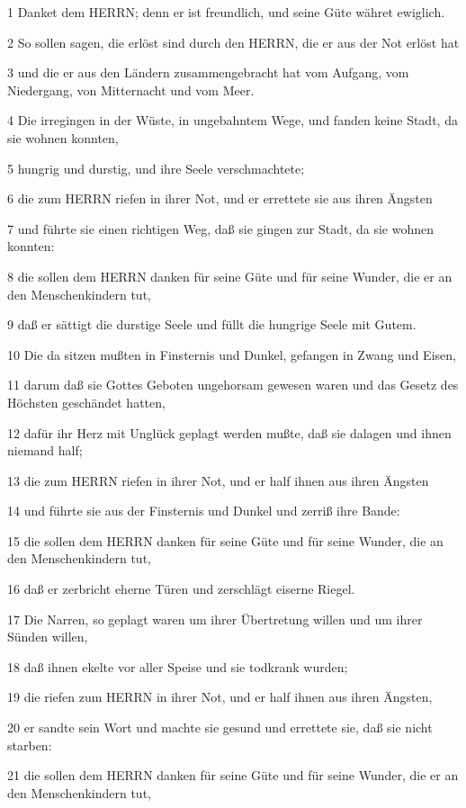 \par 1 Danket dem HERRN; denn er ist freundlich, und seine Güte währet ewiglich.
\par 2 So sollen sagen, die erlöst sind durch den HERRN, die er aus der Not erlöst hat
\par 3 und die er aus den Ländern zusammengebracht hat vom Aufgang, vom Niedergang, von Mitternacht und vom Meer.
\par 4 Die irregingen in der Wüste, in ungebahntem Wege, und fanden keine Stadt, da sie wohnen konnten,
\par 5 hungrig und durstig, und ihre Seele verschmachtete;
\par 6 die zum HERRN riefen in ihrer Not, und er errettete sie aus ihren Ängsten
\par 7 und führte sie einen richtigen Weg, daß sie gingen zur Stadt, da sie wohnen konnten:
\par 8 die sollen dem HERRN danken für seine Güte und für seine Wunder, die er an den Menschenkindern tut,
\par 9 daß er sättigt die durstige Seele und füllt die hungrige Seele mit Gutem.
\par 10 Die da sitzen mußten in Finsternis und Dunkel, gefangen in Zwang und Eisen,
\par 11 darum daß sie Gottes Geboten ungehorsam gewesen waren und das Gesetz des Höchsten geschändet hatten,
\par 12 dafür ihr Herz mit Unglück geplagt werden mußte, daß sie dalagen und ihnen niemand half;
\par 13 die zum HERRN riefen in ihrer Not, und er half ihnen aus ihren Ängsten
\par 14 und führte sie aus der Finsternis und Dunkel und zerriß ihre Bande:
\par 15 die sollen dem HERRN danken für seine Güte und für seine Wunder, die an den Menschenkindern tut,
\par 16 daß er zerbricht eherne Türen und zerschlägt eiserne Riegel.
\par 17 Die Narren, so geplagt waren um ihrer Übertretung willen und um ihrer Sünden willen,
\par 18 daß ihnen ekelte vor aller Speise und sie todkrank wurden;
\par 19 die riefen zum HERRN in ihrer Not, und er half ihnen aus ihren Ängsten,
\par 20 er sandte sein Wort und machte sie gesund und errettete sie, daß sie nicht starben:
\par 21 die sollen dem HERRN danken für seine Güte und für seine Wunder, die er an den Menschenkindern tut,
